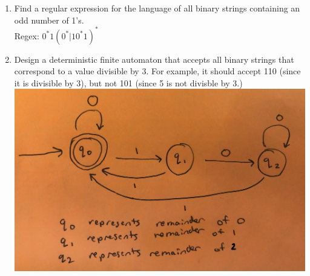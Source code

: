\documentclass{article}
\begin{document}
\begin{enumerate}
\item Find a regular expression for the language of all binary strings containing an odd number of 1's. \\
Regex: $0^{*} 1 (0^{*} | 1 0^{*} 1)^{*}$

\item Design a deterministic finite automaton that accepts all binary strings that correspond to a value divisible by 3. For example, it should accept 110 (since it is divisible by 3), but not 101 (since 5 is not divisble by 3.)\\
\includegraphics[scale=0.1]{image1.jpg}

\end{enumerate}
\end{document}
